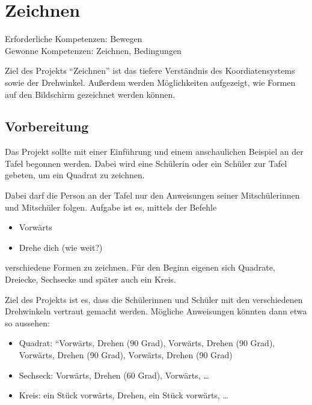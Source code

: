 \section{Zeichnen}\label{zeichnen}

Erforderliche Kompetenzen: Bewegen\\
Gewonne Kompetenzen: Zeichnen, Bedingungen

Ziel des Projekts ``Zeichnen'' ist das tiefere Verständnis des
Koordiatensystems sowie der Drehwinkel. Außerdem werden Möglichkeiten
aufgezeigt, wie Formen auf den Bildschirm gezeichnet werden können.

\begin{figure}[ht]
    \centering 
    \caption[\Sectionname]{\Sectionname}
\end{figure}

\subsection{Vorbereitung}\label{vorbereitung}

Das Projekt sollte mit einer Einführung und einem anschaulichen Beispiel
an der Tafel begonnen werden. Dabei wird eine Schülerin oder ein Schüler
zur Tafel gebeten, um ein Quadrat zu zeichnen.

Dabei darf die Person an der Tafel nur den Anweisungen seiner
Mitschülerinnen und Mitschüler folgen. Aufgabe ist es, mittels der
Befehle

\begin{itemize}
\item
  Vorwärts
\item
  Drehe dich (wie weit?)
\end{itemize}

verschiedene Formen zu zeichnen. Für den Beginn eigenen sich Quadrate,
Dreiecke, Sechsecke und später auch ein Kreis.

Ziel des Projekts ist es, dass die Schülerinnen und Schüler mit den
verschiedenen Drehwinkeln vertraut gemacht werden. Mögliche Anweisungen
könnten dann etwa so aussehen:

\begin{itemize}
\item
  Quadrat: ``Vorwärts, Drehen (90 Grad), Vorwärts, Drehen (90 Grad),
  Vorwärts, Drehen (90 Grad), Vorwärts, Drehen (90 Grad)
\item
  Sechseck: Vorwärts, Drehen (60 Grad), Vorwärts, \ldots{}
\item
  Kreis: ein Stück vorwärts, Drehen, ein Stück vorwärts, \ldots{}
\end{itemize}

